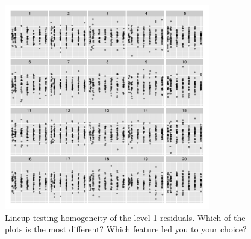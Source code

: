 \documentclass[12pt]{article}
\begin{document}


\begin{figure}[hbt]
	\centering
	\includegraphics[width=0.8\textwidth]{dialyzerheterogeneous-19.pdf}
	\caption{\label{fig:constvar2} 
	Lineup testing homogeneity of the level-1 residuals. Which of the plots is the most different? Which feature led you to your choice?}
\end{figure}
\end{document}
